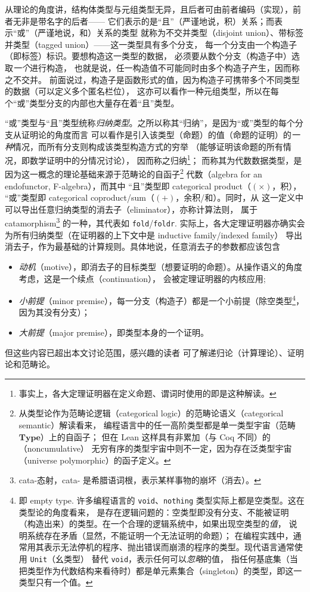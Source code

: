 \documentclass[a4paper, 11pt]{article}
\theoremstyle{remark}\newtheorem*{remark}{Remark}
\theoremstyle{definition}\newtheorem*{definition}{Definition}
\begin{document}
从理论的角度讲，结构体类型与元组类型无异，且后者可由前者编码（实现），前者无非是带名字的后者——
它们表示的是“且”（严谨地说，积）关系；而表示“或”（严谨地说，和）关系的类型
就称为不交并类型（disjoint union）、带标签并类型（tagged union）——这一类型具有多个分支，
每一个分支由一个构造子（即标签）标识。要想构造这一类型的数据，
必须要从数个分支（构造子中）选取\emph{一个}进行构造，
也就是说，任一构造值不可能同时由多个构造子产生，因而称之不交并。
前面说过，构造子是函数形式的值，因为构造子可携带多个不同类型的数据（可以定义多个匿名栏位），
这亦可以看作一种元组类型，所以在每个“或”类型分支的内部也大量存在着“且”类型。

“或”类型与“且”类型统称\emph{归纳类型}。之所以称其“归纳”，是因为“或”类型的每个分支从证明论的角度而言
可以看作是引入该类型（命题）的值（命题的证明）的\emph{一种}情况，而所有分支则构成该类型构造方式的穷举
（能够证明该命题的所有情况，即数学证明中的分情况讨论），
因而称之归纳\footnote{
  事实上，各大定理证明器在定义命题、谓词时使用的即是这种解读。
}；
而称其为代数数据类型，是因为这一概念的理论基础来源于范畴论的自函子\footnote{
  从类型论作为范畴论逻辑（categorical logic）的范畴论语义（categorical semantic）解读看来，
  编程语言中的任一高阶类型都是单一类型宇宙（范畴 $\mathbf{Type}$）上的自函子；
  但在 Lean 这样具有非累加（与 Coq 不同）的（noncumulative）
  无穷有序的类型宇宙中则不一定，因为存在泛类型宇宙（universe polymorphic）的函子定义。
}
代数（algebra for an endofunctor, F-algebra），而其中
“且”类型即 categorical product（$(\times)$，积），
“或”类型即 categorical coproduct/sum（$(+)$，余积/和）。同时，从
这一定义中可以导出任意归纳类型的消去子（eliminator），亦称计算法则，
属于 catamorphism\footnote{
  cata-态射，cata- 是希腊语词根，表示某样事物的崩坏（消去）。
}
的一种，其代表如 \texttt{fold}/\texttt{foldr}.
实际上，各大定理证明器亦确实会为所有归纳类型（在证明器的上下文中是 inductive family/indexed family）
导出消去子，作为最基础的计算规则。具体地说，任意消去子的参数都应该包含
\begin{itemize}\itemsep0em
  \item \textit{动机}（motive），即消去子的目标类型（想要证明的命题）。从操作语义的角度考虑，这是一个续点（continuation），
    会被定理证明器的内核应用;
  \item \emph{小前提}（minor premise），每一分支（构造子）都是一个小前提（除空类型\footnote{
      即 empty type. 许多编程语言的 \texttt{void}、\texttt{nothing} 类型实际上都是空类型。这在类型论的角度看来，
      是存在逻辑问题的：空类型即没有分支、不能被证明（构造出来）的类型。在一个合理的逻辑系统中，如果出现空类型的\emph{值}，
      说明系统存在矛盾（显然，不能证明一个无法证明的命题）；
      在编程实践中，通常用其表示无法停机的程序、抛出错误而崩溃的程序的类型。现代语言通常使用 \texttt{Unit}（幺类型）
      替代 \texttt{void}，表示任何可以\emph{忽略}的值，
      指任何基底集（当把类型作为代数结构来看待时）都是单元素集合（singleton）的类型，即这一类型只有一个值。
    }，因为其没有分支）；
  \item \emph{大前提}（major premise），即类型本身的一个证明。
\end{itemize}
但这些内容已超出本文讨论范围，感兴趣的读者
可了解递归论（计算理论）、证明论和范畴论。
\end{document}

